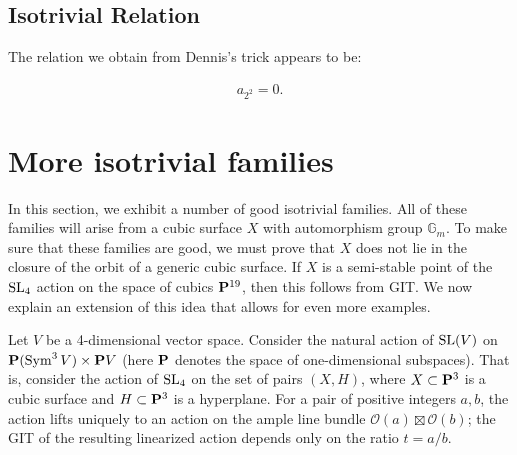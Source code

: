 \documentclass[12pt,reqno]{amsart}
\numberwithin{equation}{section}
\begin{document}
\subsection{Isotrivial Relation}
\label{sec:isotrivial-relation}

The relation we obtain from Dennis's trick appears to be:

\begin{align}
  \label{eq:relationDennis}
  a_{2^{2}} = 0.
\end{align}

\section{More isotrivial families}
In this section, we exhibit a number of good isotrivial families.  All
of these families will arise from a cubic surface $X$ with
automorphism group $\mathbb G_m$.  To make sure that these families
are good, we must prove that $X$ does not lie in the closure of the
orbit of a generic cubic surface.  If $X$ is a semi-stable point of
the $\SL_4$ action on the space of cubics $\P^{19}$, then this follows
from GIT.  We now explain an extension of this idea that allows for
even more examples.

Let $V$ be a 4-dimensional vector space.
Consider the natural action of $\SL(V)$ on $\P(\Sym^3V) \times \P V$ (here $\P$ denotes the space of one-dimensional subspaces).
That is, consider the action of $\SL_4$ on the set of pairs $(X, H)$, where $X \subset \P^3$ is a cubic surface and $H \subset \P^3$ is a hyperplane.
For a pair of positive integers $a, b$, the action lifts uniquely to an action on the ample line bundle $\mathcal O(a)\boxtimes \mathcal O(b)$; the GIT of the resulting linearized action depends only on the ratio $t = a/b$.
\end{document}
